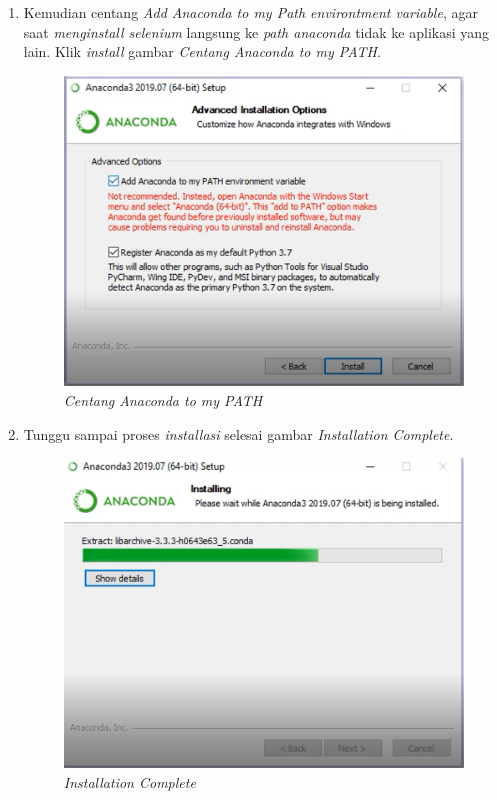 \begin{enumerate}
\item Kemudian centang \textit{Add Anaconda to my Path environtment variable}, agar saat \textit{menginstall selenium} langsung ke \textit{path anaconda} tidak ke aplikasi yang lain. Klik \textit{install}
 gambar \textit{Centang Anaconda to my PATH}.

\begin{figure}[H]
    \centering
    \includegraphics[scale=0.5]{figures/7}
    \caption{\textit{Centang Anaconda to my PATH}}
    \label{Figureanaconda6}
\end{figure}

\item Tunggu sampai proses \textit{installasi} selesai
 gambar \textit{Installation Complete}.

\begin{figure}[H]
    \centering
    \includegraphics[scale=0.5]{figures/8}
    \caption{\textit{Installation Complete}}
    \label{Figureanaconda7}
\end{figure}


\end{enumerate}
